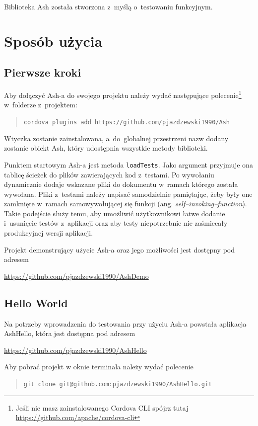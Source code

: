 \documentclass{xmgr}
\begin{document}
Biblioteka Ash została stworzona z~myślą o~testowaniu funkcyjnym.

\chapter{Sposób użycia}
\section{Pierwsze kroki}

Aby dołączyć Ash-a do swojego projektu należy wydać następujące polecenie\footnote{Jeśli nie masz zainstalowanego Cordova CLI spójrz tutaj \url{https://github.com/apache/cordova-cli} } w~folderze z~projektem:
\begin{quote}
   \texttt{cordova plugins add https://github.com/pjazdzewski1990/Ash}
\end{quote}

Wtyczka zostanie zainstalowana, a~do~globalnej przestrzeni nazw dodany zostanie obiekt Ash, który udostępnia wszystkie metody biblioteki.

Punktem startowym Ash-a jest metoda \texttt{loadTests}. Jako argument przyjmuje ona tablicę ścieżek do plików zawierających kod z~testami. Po wywołaniu dynamicznie dodaje wskazane pliki do dokumentu w~ramach którego została wywołana. Pliki z~testami należy napisać samodzielnie pamiętając, żeby były one zamknięte w~ramach samowywołującej się funkcji (ang. \textit{self--invoking--function}). Takie podejście służy temu, aby umożliwić użytkownikowi łatwe dodanie i~usunięcie testów z~aplikacji oraz aby testy niepotrzebnie nie zaśmiecały produkcyjnej wersji aplikacji.

Projekt demonstrujący użycie Ash-a oraz jego możliwości jest dostępny pod adresem

\url{https://github.com/pjazdzewski1990/AshDemo}

\section{Hello World}

Na potrzeby wprowadzenia do testowania przy użyciu Ash-a powstała aplikacja AshHello, która jest dostępna pod adresem 

\url{https://github.com/pjazdzewski1990/AshHello}

\noindent Aby pobrać projekt w oknie terminala należy wydać polecenie

\begin{quote}
   \texttt{git clone git@github.com:pjazdzewski1990/AshHello.git}
\end{quote}
\end{document}

